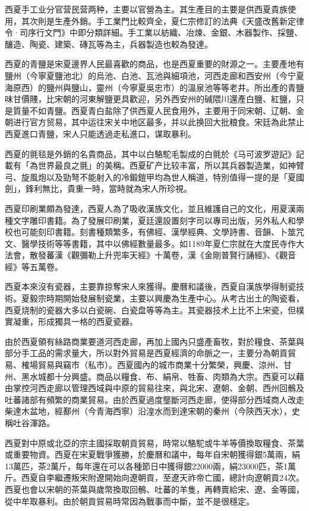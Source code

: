 西夏手工业分官营民营两种，主要以官營為主。其生產目的主要是供西夏貴族使用，其次則是生產外銷。手工業門比較齊全，夏仁宗修訂的法典《天盛改舊新定律令·司序行文門》中即分類詳細。手工業以紡織、冶煉、金銀、木器製作、採鹽、釀造、陶瓷、建築、磚瓦等為主，兵器製造也較為發達。

西夏的青鹽是宋夏邊界人民最喜歡的商品，也是西夏重要的財源之一。主要產地有鹽州（今寧夏鹽池北）的烏池、白池、瓦池與細項池，河西走廊和西安州（今宁夏海原西）的鹽州與鹽山，靈州（今寧夏吳忠市）的溫泉池等等老井。所出產的青鹽味甘價賤，比宋朝的河東解鹽更具歡迎，另外西安州的碱隈川還產白鹽、紅鹽，只是質量不如青鹽。西夏青白盐除了供西夏人民食用外，主要用于同宋朝、辽朝、金朝进行官方贸易，其中运往宋关中地区最多，并以此换回大批粮食。宋廷為此禁止西夏進口青鹽，宋人只能透過走私進口，谋取暴利。

西夏的氈毯是外銷的名貴商品，其中以白駱駝毛製成的白氈於《马可波罗遊記》記載有「為世界最良之氈」的美稱。西夏矿产比较丰富，所以其兵器製造業，如神臂弓、旋風炮以及勁弩不能射入的冷鍛鎧甲均為世人稱道，特別值得一提的是「夏國劍」，鋒利無比，貴重一時，當時就為宋人所珍視。

西夏印刷業頗為發達，西夏人為了吸收漢族文化，並且維護自己的文化，用夏漢兩種文字雕印書籍。為了發展印刷業，夏廷還設置刻字司以專司出版，另外私人和學校也可能刻印書籍。刻書種類繁多，有佛經、漢學經典、文學詩書、音韻、卜筮咒文、醫學技術等等書籍，其中以佛經數量最多。如1189年夏仁宗就在大度民寺作大法會，散發蕃漢《觀彌勒上升兜率天經》十萬卷，漢《金剛普賢行誦經》、《觀音經》等五萬卷。

西夏本來沒有瓷器，主要靠掠奪宋人來獲得。慶曆和議後，西夏自漢族學得制瓷技術。夏毅宗時期開始發展制瓷業，主要以興慶為生產中心。从考古出土的陶瓷看，西夏烧制的瓷器大多以白瓷碗、白瓷盘等等為主。其瓷器技术上比不上宋瓷，但樸實凝重，形成獨具一格的西夏瓷器。

由於西夏領有絲路商業要道河西走廊，再加上國內只盛產畜牧，對於糧食、茶葉與部分手工品的需求量大，所以對外貿易是西夏經濟的命脈之一，主要分為朝貢貿易、榷場貿易與竊市（私市）。西夏國內的城市商業十分繁榮，興慶、涼州、甘州、黑水城都十分興盛。商品以糧食、布、絹帛、牲畜、肉類為大宗。西夏可以藉由掌控河西走廊以管理西域與中原的貿易往來，與北宋、遼朝、金朝、西州回鶻及吐蕃諸部有頻繁的商業貿易。由於西夏過度壟斷河西走廊，使得部分西域商人改走柴達木盆地，經鄯州（今青海西寧）沿湟水而到達宋朝的秦州（今陝西天水），史稱吐谷渾路。

西夏對中原或北亞的宗主國採取朝貢貿易，時常以駱駝或牛羊等價換取糧食、茶葉或重要物資。西夏在宋夏戰爭獲勝，於慶曆和議中，每年自宋朝獲得銀5萬兩，絹13萬匹，茶2萬斤，每年還在可以各種節日中獲得銀22000兩，絹23000匹，茶1萬斤。西夏自李繼遷叛宋附遼開始向遼朝貢，至遼天祚帝亡國，總計向遼朝貢24次。西夏也會以宋朝的茶葉與歲幣換取回鶻、吐蕃的羊隻，再轉賣給宋、遼、金等國，從中牟取暴利。由於朝貢貿易時常因為戰事而中斷，並不是很穩定。

